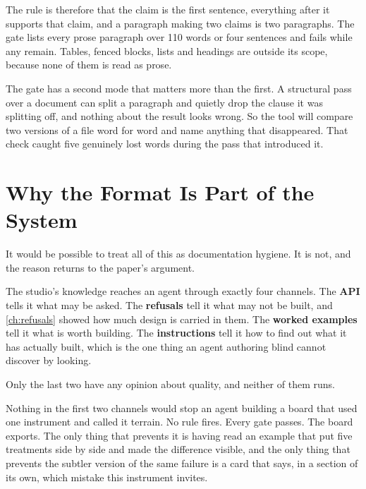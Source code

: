 The rule is therefore that the claim is the first sentence, everything after it
supports that claim, and a paragraph making two claims is two paragraphs. The gate
lists every prose paragraph over 110 words or four sentences and fails while any
remain. Tables, fenced blocks, lists and headings are outside its scope, because
none of them is read as prose.

The gate has a second mode that matters more than the first. A structural pass over
a document can split a paragraph and quietly drop the clause it was splitting off,
and nothing about the result looks wrong. So the tool will compare two versions of
a file word for word and name anything that disappeared. That check caught five
genuinely lost words during the pass that introduced it.

\section{Why the Format Is Part of the System}

It would be possible to treat all of this as documentation hygiene. It is not, and
the reason returns to the paper's argument.

The studio's knowledge reaches an agent through exactly four channels. The
\textbf{API} tells it what may be asked. The \textbf{refusals} tell it what may not
be built, and \cref{ch:refusals} showed how much design is carried in them. The
\textbf{worked examples} tell it what is worth building. The \textbf{instructions}
tell it how to find out what it has actually built, which is the one thing an agent
authoring blind cannot discover by looking.

Only the last two have any opinion about quality, and neither of them runs.

Nothing in the first two channels would stop an agent building a board that used
one instrument and called it terrain. No rule fires. Every gate passes. The board
exports. The only thing that prevents it is having read an example that put five
treatments side by side and made the difference visible, and the only thing that
prevents the subtler version of the same failure is a card that says, in a section
of its own, which mistake this instrument invites.
